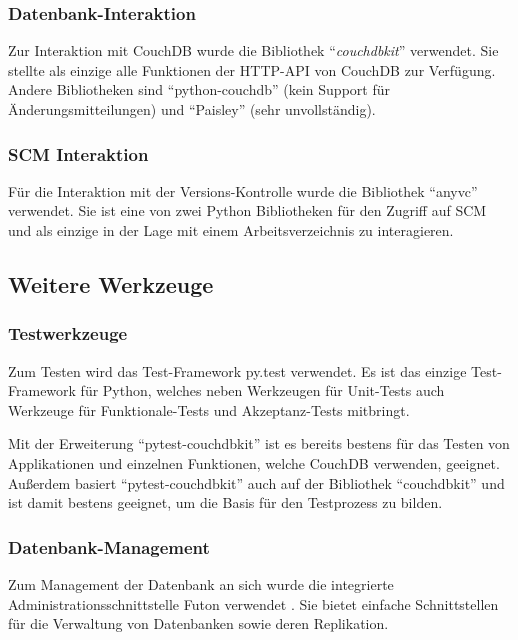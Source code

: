 \subsubsection{Datenbank-Interaktion}

Zur Interaktion mit CouchDB wurde die Bibliothek ``\emph{couchdbkit}'' \cite{couchdbkit:website} verwendet.
Sie stellte als einzige alle Funktionen der HTTP-API von CouchDB zur Verfügung.
Andere Bibliotheken sind ``python-couchdb'' (kein Support für Änderungsmitteilungen)
und ``Paisley'' (sehr unvollständig).

\subsubsection{SCM Interaktion}

Für die Interaktion mit der Versions-Kontrolle wurde die Bibliothek ``anyvc'' \cite{anyvc:website} verwendet.
Sie ist eine von zwei Python Bibliotheken für den Zugriff auf SCM
und als einzige in der Lage mit einem Arbeitsverzeichnis zu interagieren.

\subsection{Weitere Werkzeuge}

\subsubsection{Testwerkzeuge}

Zum Testen wird das Test-Framework py.test \cite{pytest:website} verwendet.
Es ist das einzige Test-Framework für Python,
welches neben Werkzeugen für Unit-Tests auch Werkzeuge für
Funktionale-Tests und Akzeptanz-Tests mitbringt.

Mit der Erweiterung ``pytest-couchdbkit'' \cite{pytest:couchdbkit} ist es bereits
bestens für das Testen von Applikationen und einzelnen Funktionen,
welche CouchDB verwenden, geeignet.
Außerdem basiert ``pytest-couchdbkit'' auch auf der Bibliothek ``couchdbkit''
und ist damit bestens geeignet, um die Basis für den Testprozess zu bilden.

\subsubsection{Datenbank-Management}

Zum Management der Datenbank an sich wurde die integrierte Administrationsschnittstelle Futon verwendet \cite{couchdb:futon}.
Sie bietet einfache Schnittstellen für die Verwaltung von Datenbanken sowie deren Replikation.

